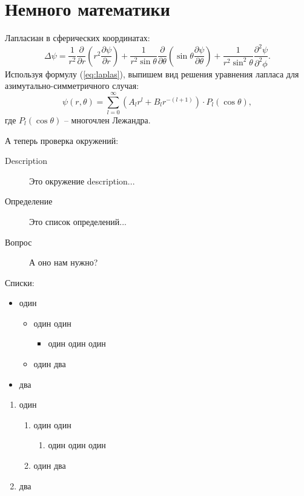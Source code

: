 \documentclass{hedwork}
\begin{document}
\section{Немного математики}
Лапласиан в сферических координатах:
\begin{equation}
    \Delta\psi = \frac{1}{r^2}\frac{\partial}{\partial r}
    \left( r^2 \frac{\partial \psi}{\partial r} \right) +
    \frac{1}{r^2\sin\theta}\frac{\partial}{\partial\theta}
    \left(\sin\theta\frac{\partial\psi}{\partial\theta}\right) +
    \frac{1}{r^2\sin^2\theta}\frac{\partial^2\psi}{\partial^2\phi}.
    \label{eq:laplas}
\end{equation}
Используя формулу (\ref{eq:laplas}), выпишем вид решения уравнения лапласа для
азимутально-симметричного случая:
\begin{equation}
    \psi(r,\theta) = \sum_{l=0}^\infty\left(A_lr^l + B_lr^{-(l+1)}\right)\cdot
    P_l(\cos\theta),
\end{equation}
где \(P_l(\cos\theta)\) -- многочлен Лежандра.

А теперь проверка окружений:
\begin{description}
    \item[Description] Это окружение description...
    \item[Определение] Это список определений...
    \item[Вопрос] А оно нам нужно?
\end{description}

Списки:
\begin{itemize}
    \item один
    \begin{itemize}
         \item один один
         \begin{itemize}
             \item один один один
         \end{itemize}
         \item один два
     \end{itemize} 
     \item два
\end{itemize}
\begin{enumerate}
    \item один
    \begin{enumerate}
         \item один один
         \begin{enumerate}
             \item один один один
         \end{enumerate}
         \item один два
     \end{enumerate} 
     \item два
\end{enumerate}
    
\end{document}
